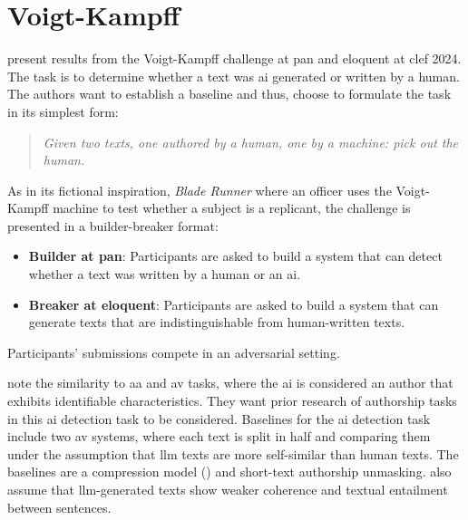 \section{Voigt-Kampff}
\label{sec:voigt_kampff}
\newcommand{\voigtkampff}{Voigt-Kampff}

\citet{bevendorff_overview_2024} present results from the \voigtkampff{} challenge at 
\ac{pan} and \ac{eloquent} at \ac{clef} 2024.
The task is to determine whether a text was \ac{ai} generated or written by a human.
The authors want to establish a baseline and thus, choose to formulate the task in its simplest form:
\begin{quote}
    \textit{Given two texts, one authored by a human, one by a machine: pick out the human.}
\end{quote}
As in its fictional inspiration, 
\textit{Blade Runner} where an officer uses the \voigtkampff{} machine to test whether a subject is a replicant, 
the challenge is presented in a builder-breaker format:
\begin{itemize}
    \item \textbf{Builder at \ac{pan}}: Participants are asked to build a system that can detect 
    whether a text was written by a human or an \ac{ai}.
    \item \textbf{Breaker at \ac{eloquent}}: Participants are asked to build a system that can 
    generate texts that are indistinguishable from human-written texts.
\end{itemize}
Participants' submissions compete in an adversarial setting.

\citet{bevendorff_overview_2024} note the similarity to \ac{aa} and \ac{av} tasks, 
where the \ac{ai} is considered an author that exhibits identifiable characteristics.
They want prior research of authorship tasks in this \ac{ai} detection task to be considered.
Baselines for the \ac{ai} detection task include two \ac{av} systems, 
where each text is split in half and comparing them under the assumption that \ac{llm} texts 
are more self-similar than human texts.
The baselines are a compression model () and 
short-text authorship unmasking.
\citet{bevendorff_overview_2024} also assume that \ac{llm}-generated texts show 
weaker coherence and textual entailment between sentences.

